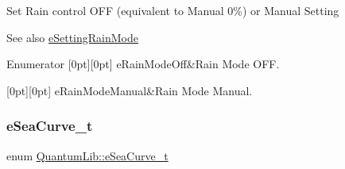 Set Rain control O\+FF (equivalent to Manual 0\%) or Manual Setting \begin{DoxySeeAlso}{See also}
\mbox{\hyperlink{namespace_quantum_lib_acc8124e3e65bca4aa798d03a55e3d54ca0fcb9b4e8d9018ce53ee9f57221392b1}{e\+Setting\+Rain\+Mode}} 
\end{DoxySeeAlso}
\begin{DoxyEnumFields}{Enumerator}
[0pt][0pt]{}\mbox{\label{namespace_quantum_lib_a881f6940f59e1d22cecd947de841b245a23d55172337289a683d16dd7c790132f}} 
e\+Rain\+Mode\+Off&Rain Mode O\+FF. \\
\hline

[0pt][0pt]{}\mbox{\label{namespace_quantum_lib_a881f6940f59e1d22cecd947de841b245a23fd258b5a79942f441435c2dbe5543d}} 
e\+Rain\+Mode\+Manual&Rain Mode Manual. \\
\hline

\end{DoxyEnumFields}
\mbox{\label{namespace_quantum_lib_aeaeea421c9323b85e6b45fa78e3b2a06}} 
\subsubsection{\texorpdfstring{e\+Sea\+Curve\+\_\+t}{eSeaCurve\_t}}
{\footnotesize\ttfamily enum \mbox{\hyperlink{namespace_quantum_lib_aeaeea421c9323b85e6b45fa78e3b2a06}{Quantum\+Lib\+::e\+Sea\+Curve\+\_\+t}}}

